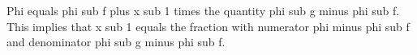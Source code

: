 Phi equals phi sub f plus x sub 1 times the quantity phi sub g minus phi sub f. This implies that x sub 1 equals the fraction with numerator phi minus phi sub f and denominator phi sub g minus phi sub f.